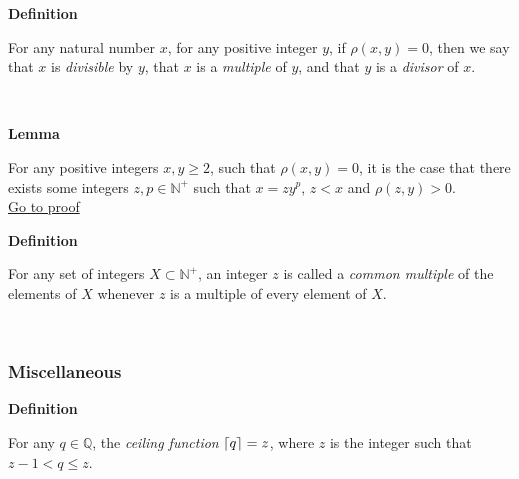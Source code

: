 \documentclass[a4paper,12pt]{article}
\DeclarePairedDelimiter{\ceil}{\lceil}{\rceil}
\begin{document}
\label{definition:divisibility}
\hypertarget{definition:divisibility}{}
\begin{tcolorbox}
\textbf{Definition}

\noindent For any natural number $x$, for any positive integer $y$, if $\rho(x,y) = 0$, then we say that $x$ is \textit{divisible} by $y$, that $x$ is a \textit{multiple} of $y$, and that $y$ is a \textit{divisor} of $x$.
\end{tcolorbox}
\noindent \\





\label{lemma:remainder_powers}
\hypertarget{lemma:remainder_powers}{}
\begin{tcolorbox}
\textbf{Lemma}

\noindent For any positive integers $x, y \geq 2$, such that $\rho(x,y) = 0$, it is the case that there exists some integers $z, p \in \mathbb{N}^+$ such that $x = zy^p$, $z < x$ and $\rho(z, y) > 0$.\\

\noindent \hyperlink{proof:remainder_powers}{Go to proof}

\end{tcolorbox}




\label{definition:common_multiple}
\hypertarget{definition:common_multiple}{}
\begin{tcolorbox}
\textbf{Definition}

\noindent For any set of integers $X \subset \mathbb{N}^+$, an integer $z$ is called a \textit{common multiple} of the elements of $X$ whenever $z$ is a multiple of every element of $X$.
\end{tcolorbox}
\noindent \\








\subsubsection{Miscellaneous}
\label{subsubsection:miscellaneous}




\label{definition:ceiling_function}
\hypertarget{definition:ceiling_function}{}
\begin{tcolorbox}
\textbf{Definition}

\noindent For any $q \in \mathbb{Q}$, the \textit{ceiling function} $\ceil{q} = z$, where $z$ is the integer such that $z - 1 < q \leq z$.
\end{tcolorbox}
\noindent \\
\end{document}
